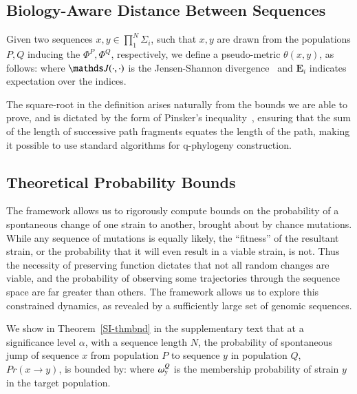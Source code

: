 {\subsection*{Biology-Aware Distance Between Sequences}

\begin{defn}\label{defqdistance}
Given two sequences $x,y \in \prod_1^N\Sigma_i$, such that $x,y$ are drawn from the  populations $P,Q$  inducing the \qnet $\Phi^P,\Phi^Q$, respectively,  we define a pseudo-metric $\theta(x,y) $, as follows:
where $ \J(\cdot,\cdot)$ is the Jensen-Shannon divergence~\cite{manning1999foundations} and $\mathbf{E}_i$ indicates expectation over the indices.
\end{defn}
The square-root in the definition arises naturally from the bounds we are able to prove, and is dictated by the form of Pinsker's inequality~\cite{cover}, ensuring that   the sum of the length of successive path fragments equates the length of the path, making it possible to use standard  algorithms  for q-phylogeny construction.





\subsection*{Theoretical Probability Bounds}

The \qnet framework  allows us to rigorously compute bounds on the probability of a spontaneous change of one strain to another, brought about by chance mutations. While any sequence of mutations is equally likely, the ``fitness'' of the resultant strain, or the probability that it will even result in a viable strain, is not. Thus the necessity of preserving  function  dictates that not all random changes  are viable, and the probability of observing some trajectories through the sequence space  are far greater  than others. The \qnet framework allows us to explore this constrained dynamics, as revealed by a sufficiently large set of genomic sequences.

We show in Theorem~\ref{SI-thmbnd} in the supplementary text that at a significance level $\alpha$, with a sequence length $N$, the probability of spontaneous jump of sequence $x$ from population $P$ to sequence $y$ in population $Q$, $Pr(x \rightarrow y)$, is bounded by:
where $\omega_{y}^Q$ is the membership probability of strain $y$ in the target population.

}
